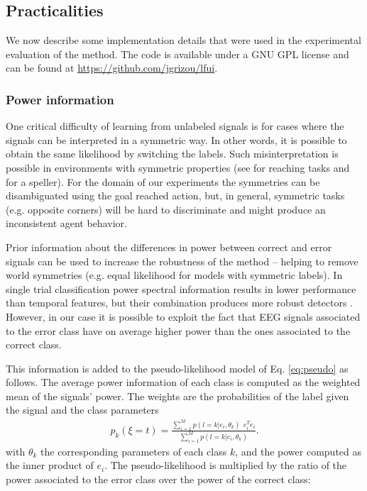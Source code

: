 \subsection{Practicalities}
We now describe some implementation details that were used in the experimental evaluation of the method.  The code is available under a GNU GPL license and can be found at \url{https://github.com/jgrizou/lfui}.

\subsubsection{Power information}
One  critical difficulty of learning from unlabeled signals is for cases where the signals can be interpreted in a symmetric way. In other words, it is possible to obtain the same likelihood by switching the labels. Such misinterpretation is possible in environments with symmetric properties (see \cite{grizou2014interactive} for reaching tasks and \cite{Kindermans2012a,kindermans2014true} for a speller). For the domain of our experiments the symmetries can be disambiguated using the goal reached action, but, in general, symmetric tasks (e.g. opposite corners) will be hard to discriminate and might produce an inconsistent agent behavior.

Prior information about the differences in power between correct and error signals can be used to increase the robustness of the method -- helping to remove world symmetries (e.g. equal likelihood for models with symmetric labels). 
In single trial classification power spectral information results in lower performance than temporal features, but their combination produces more robust detectors \cite{Omedes13ErrPFreq}.
%
However, in our case it is possible to exploit the fact that EEG signals associated to the error class have on average higher power than the ones associated to the correct class.

This information is added to the pseudo-likelihood model of Eq. \ref{eq:pseudo} as follows. The average power information of each class is computed as  the weighted mean of the signals' power. The weights are the probabilities of the label given the signal and the class parameters 
%
\begin{eqnarray}
p_k(\xi=t) = \frac{\sum_{i = 1}^{M} p(l = k | e_i , \theta_k) ~~ e_i^T e_i}{\sum_{i = 1}^{M} p(l = k | e_i , \theta_k)}.
\label{eq:powerCorrect}
\end{eqnarray}
%
with $\theta_k$ the corresponding parameters of each class $k$, and the power computed as the inner product of $e_i$.
%
The pseudo-likelihood is multiplied by the ratio of the power associated to the error class over the power of the correct class:

